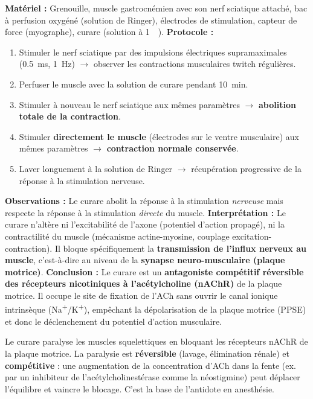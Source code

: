 \documentclass[11pt]{article}
\begin{document}
\begin{experience}
\textbf{Matériel :} Grenouille, muscle gastrocnémien avec son nerf sciatique attaché, bac à perfusion oxygéné (solution de Ringer), électrodes de stimulation, capteur de force (myographe), curare (solution à \SI{1}{\micro\molar}).
\textbf{Protocole :}
\begin{enumerate}
    \item Stimuler le nerf sciatique par des impulsions électriques supramaximales (\SI{0.5}{\milli\second}, \SI{1}{\hertz}) $\rightarrow$ observer les contractions musculaires twitch régulières.
    \item Perfuser le muscle avec la solution de curare pendant \SI{10}{\minute}.
    \item Stimuler à nouveau le nerf sciatique aux mêmes paramètres $\rightarrow$ \textbf{abolition totale de la contraction}.
    \item Stimuler \textbf{directement le muscle} (électrodes sur le ventre musculaire) aux mêmes paramètres $\rightarrow$ \textbf{contraction normale conservée}.
    \item Laver longuement à la solution de Ringer $\rightarrow$ récupération progressive de la réponse à la stimulation nerveuse.
\end{enumerate}
\textbf{Observations :} Le curare abolit la réponse à la stimulation \emph{nerveuse} mais respecte la réponse à la stimulation \emph{directe} du muscle.
\textbf{Interprétation :} Le curare n'altère ni l'excitabilité de l'axone (potentiel d'action propagé), ni la contractilité du muscle (mécanisme actine-myosine, couplage excitation-contraction). Il bloque spécifiquement la \textbf{transmission de l'influx nerveux au muscle}, c'est-à-dire au niveau de la \textbf{synapse neuro-musculaire (plaque motrice)}.
\textbf{Conclusion :} Le curare est un \textbf{antagoniste compétitif réversible des récepteurs nicotiniques à l'acétylcholine (nAChR)} de la plaque motrice. Il occupe le site de fixation de l'ACh sans ouvrir le canal ionique intrinsèque (Na\textsuperscript{+}/K\textsuperscript{+}), empêchant la dépolarisation de la plaque motrice (PPSE) et donc le déclenchement du potentiel d'action musculaire.
\end{experience}

\begin{propriete}
Le curare paralyse les muscles squelettiques en bloquant les récepteurs nAChR de la plaque motrice. La paralysie est \textbf{réversible} (lavage, élimination rénale) et \textbf{compétitive} : une augmentation de la concentration d'ACh dans la fente (ex. par un inhibiteur de l'acétylcholinestérase comme la néostigmine) peut déplacer l'équilibre et vaincre le blocage. C'est la base de l'antidote en anesthésie.
\end{propriete}
\end{document}
